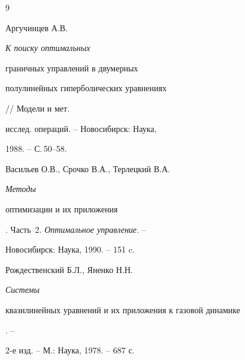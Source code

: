 \begin{thebibliography}{9}


Аргучинцев А.В. {\it К поиску оптимальных


граничных управлений в двумерных


полулинейных гиперболических уравнениях} // Модели и мет.


исслед. операций. -- Новосибирск: Наука,


1988. -- С.\,50--58.




Васильев О.В., Срочко В.А., Терлецкий В.А.{\it Методы


оптимизации и их приложения}. Часть~2. {\it Оптимальное управление}. -- 


Новосибирск: Наука, 1990. -- 151 c.




Рождественский Б.Л., Яненко Н.Н. {\it Системы


квазилинейных уравнений и их приложения к газовой динамике}. -- 


2-е изд. -- М.: Наука, 1978. -- 687 с.





\end{thebibliography}





\vskip 2cm












\label{end}





